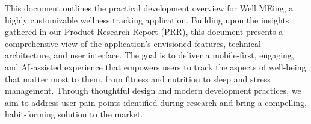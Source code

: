This document outlines the practical development overview for Well MEing, a highly customizable wellness tracking application. 
Building upon the insights gathered in our Product Research Report (PRR), this document presents a comprehensive view of the application's envisioned features, technical architecture, and user interface. 
The goal is to deliver a mobile-first, engaging, and AI-assisted experience that empowers users to track the aspects of well-being that matter most to them, from fitness and nutrition to sleep and stress management. 
Through thoughtful design and modern development practices, we aim to address user pain points identified during research and bring a compelling, habit-forming solution to the market.